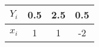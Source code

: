 
\begin{tabular}{|c|c|c|c|}
\hline
$Y_i$ & 0.5 & 2.5 & 0.5 \\ \hline
$x_i$ & 1 & 1 & -2 \\ \hline
\end{tabular}


